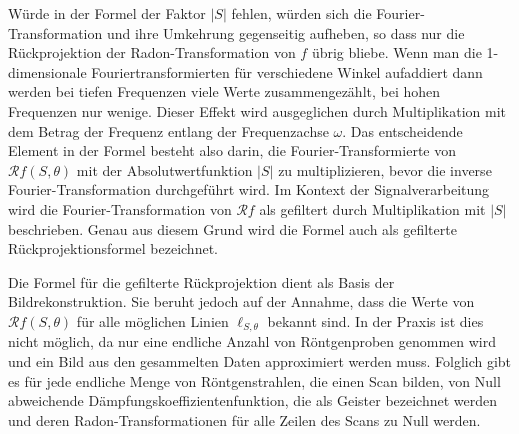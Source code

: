 Würde in der Formel der Faktor $|S|$ fehlen, würden sich die Fourier-Transformation und ihre Umkehrung gegenseitig aufheben, so dass nur die Rückprojektion der Radon-Transformation von $f$ übrig bliebe. Wenn man die 1-dimensionale Fouriertransformierten für verschiedene Winkel aufaddiert dann werden bei tiefen Frequenzen viele Werte zusammengezählt, bei hohen Frequenzen nur wenige. Dieser Effekt wird ausgeglichen durch Multiplikation mit dem Betrag der Frequenz entlang der Frequenzachse $\omega$. Das entscheidende Element in der Formel besteht also darin, die Fourier-Transformierte von $\mathscr{R}f(S, \theta)$ mit der Absolutwertfunktion $|S|$ zu multiplizieren, bevor die inverse Fourier-Transformation durchgeführt wird. Im Kontext der Signalverarbeitung wird die Fourier-Transformation von $\mathscr{R}f$ als gefiltert durch Multiplikation mit $|S|$ beschrieben. Genau aus diesem Grund wird die Formel auch als \glqq gefilterte Rückprojektionsformel\grqq{} bezeichnet.

Die Formel für die gefilterte Rückprojektion dient als Basis der Bildrekonstruktion. Sie beruht jedoch auf der Annahme, dass die Werte von $\mathscr{R}f(S, \theta)$ für alle möglichen Linien $\ell_{S, \theta}$ bekannt sind. In der Praxis ist dies nicht möglich, da nur eine endliche Anzahl von Röntgenproben genommen wird und ein Bild aus den gesammelten Daten approximiert werden muss. Folglich gibt es für jede endliche Menge von Röntgenstrahlen, die einen Scan bilden, von Null abweichende Dämpfungskoeffizientenfunktion, die als \glqq Geister \grqq{} bezeichnet werden und deren Radon-Transformationen für alle Zeilen des Scans zu Null werden.




















